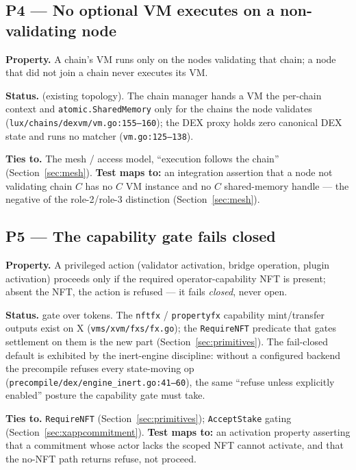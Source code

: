 \subsection*{P4 --- No optional VM executes on a non-validating node}

\textbf{Property.} A chain's VM runs only on the nodes validating that
chain; a node that did not join a chain never executes its VM.

\textbf{Status.} \IMPL{} (existing topology). The chain manager hands a
VM the per-chain context and \texttt{atomic.SharedMemory} only for the
chains the node validates
(\texttt{lux/chains/dexvm/vm.go:155--160}); the DEX proxy holds zero
canonical DEX state and runs no matcher
(\texttt{vm.go:125--138}).

\textbf{Ties to.} The mesh / access model, ``execution follows the
chain'' (Section~\ref{sec:mesh}). \textbf{Test maps to:} an integration
assertion that a node not validating chain $C$ has no $C$ VM instance
and no $C$ shared-memory handle --- the negative of the role-2/role-3
distinction (Section~\ref{sec:mesh}).

\subsection*{P5 --- The capability gate fails closed}

\textbf{Property.} A privileged action (validator activation, bridge
operation, plugin activation) proceeds only if the required
operator-capability NFT is present; absent the NFT, the action is
refused --- it fails \emph{closed}, never open.

\textbf{Status.} \DESIGN{} gate over \IMPL{} tokens. The \texttt{nftfx} /
\texttt{propertyfx} capability mint/transfer outputs exist on X
(\texttt{vms/xvm/fxs/fx.go}); the \texttt{RequireNFT} predicate that
gates settlement on them is the new part (Section~\ref{sec:primitives}).
The fail-closed default is exhibited by the inert-engine discipline:
without a configured backend the precompile refuses every state-moving
op (\texttt{precompile/dex/engine\_inert.go:41--60}), the same
``refuse unless explicitly enabled'' posture the capability gate must
take.

\textbf{Ties to.} \texttt{RequireNFT} (Section~\ref{sec:primitives});
\texttt{AcceptStake} gating (Section~\ref{sec:xappcommitment}).
\textbf{Test maps to:} an activation property asserting that a commitment
whose actor lacks the scoped NFT cannot activate, and that the
no-NFT path returns refuse, not proceed.

